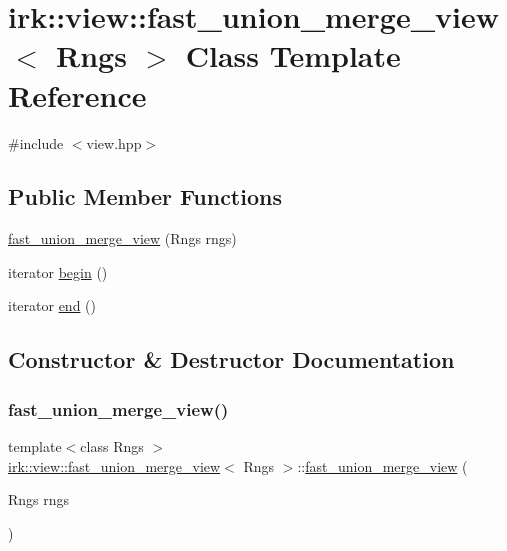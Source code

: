 \hypertarget{classirk_1_1view_1_1fast__union__merge__view}{}\section{irk\+:\+:view\+:\+:fast\+\_\+union\+\_\+merge\+\_\+view$<$ Rngs $>$ Class Template Reference}
\label{classirk_1_1view_1_1fast__union__merge__view}


{\ttfamily \#include $<$view.\+hpp$>$}

\subsection*{Public Member Functions}
\begin{DoxyCompactItemize}
\item 
\mbox{\hyperlink{classirk_1_1view_1_1fast__union__merge__view_a9c8242fad4216e914558491d759d0aeb}{fast\+\_\+union\+\_\+merge\+\_\+view}} (Rngs rngs)
\item 
iterator \mbox{\hyperlink{classirk_1_1view_1_1fast__union__merge__view_a82c8219a38fc24706d3744af07a974f7}{begin}} ()
\item 
iterator \mbox{\hyperlink{classirk_1_1view_1_1fast__union__merge__view_a4d2d07efe1f3c65330bb31545816aa0f}{end}} ()
\end{DoxyCompactItemize}


\subsection{Constructor \& Destructor Documentation}
\mbox{\label{classirk_1_1view_1_1fast__union__merge__view_a9c8242fad4216e914558491d759d0aeb}} 
\subsubsection{\texorpdfstring{fast\+\_\+union\+\_\+merge\+\_\+view()}{fast\_union\_merge\_view()}}
{\footnotesize\ttfamily template$<$class Rngs $>$ \\
\mbox{\hyperlink{classirk_1_1view_1_1fast__union__merge__view}{irk\+::view\+::fast\+\_\+union\+\_\+merge\+\_\+view}}$<$ Rngs $>$\+::\mbox{\hyperlink{classirk_1_1view_1_1fast__union__merge__view}{fast\+\_\+union\+\_\+merge\+\_\+view}} (\begin{DoxyParamCaption}\item[{Rngs}]{rngs }\end{DoxyParamCaption})\hspace{0.3cm}{\ttfamily [inline]}}



